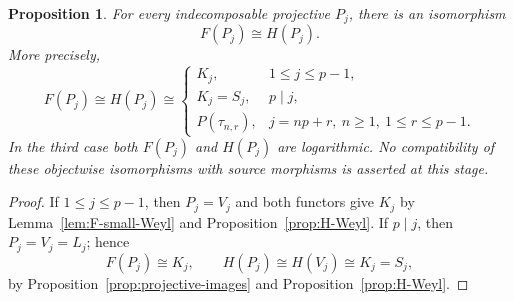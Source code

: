 \documentclass[12pt,leqno]{amsart}
\numberwithin{equation}{section}
\newtheorem{prop}[thm]{Proposition}
\begin{document}
\begin{prop}\label{prop:projective-object-comparison}
For every indecomposable projective $P_j$, there is an isomorphism
\[
 F(P_j)\cong H(P_j).
\]
More precisely,
\[
 F(P_j)\cong H(P_j)\cong
 \begin{cases}
  K_j,&1\le j\le p-1,\\
  K_j=S_j,&p\mid j,\\
  P(\tau_{n,r}),&j=np+r,\ n\ge1,\ 1\le r\le p-1.
 \end{cases}
\]
In the third case both $F(P_j)$ and $H(P_j)$ are logarithmic.
No compatibility of these objectwise isomorphisms with source morphisms is
asserted at this stage.
\end{prop}

\begin{proof}
If $1\le j\le p-1$, then $P_j=V_j$ and both functors give $K_j$ by
Lemma~\ref{lem:F-small-Weyl} and Proposition~\ref{prop:H-Weyl}.  If
$p\mid j$, then $P_j=V_j=L_j$; hence
\[
 F(P_j)\cong K_j,
 \qquad
 H(P_j)\cong H(V_j)\cong K_j=S_j,
\]
by Proposition~\ref{prop:projective-images} and
Proposition~\ref{prop:H-Weyl}.


\end{proof}
\end{document}
